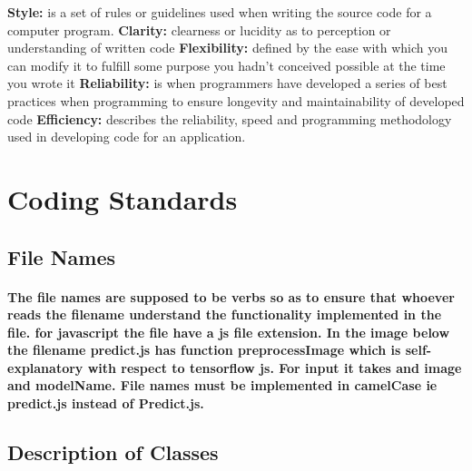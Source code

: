 \documentclass[10pt]{article}
\begin{document}
	\textbf{Style: }  is a set of rules or guidelines used when writing the source code for a computer program. 
	\newline 
	\textbf{Clarity: } clearness or lucidity as to perception or understanding of written code
	\newline
	\textbf{Flexibility: } defined by the ease with which you can modify it to fulfill some purpose you hadn't conceived possible at the time you wrote it
	\newline
	\textbf{Reliability: } is when programmers have developed a series of best practices when programming to ensure  longevity and maintainability of developed code
	\newline
	\textbf{Efficiency: }describes the reliability, speed and programming methodology used in developing code for an application.
	
	\section{Coding Standards}
	    \subsection{File Names}
	    \paragraph{
	    The file names are supposed to be verbs so as to ensure that whoever reads the filename understand the functionality implemented in the file. for javascript the file have a js file extension. In the image below the filename predict.js has function preprocessImage which is self-explanatory with respect to tensorflow js. For input it takes and image and modelName. File names must be implemented in camelCase ie predict.js instead of  Predict.js.
	    }
	    
	    \subsection{Description of Classes}
\end{document}
